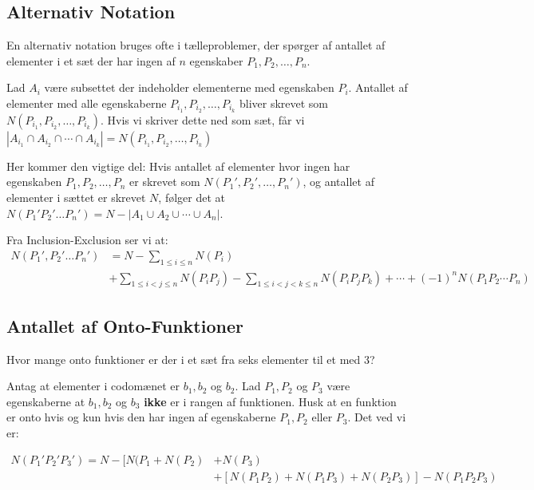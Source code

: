 \documentclass[11pt]{article}
\theoremstyle{definition}
\theoremstyle{remark}
\begin{document}
\subsection{Alternativ Notation}
\label{subsec:label}

En alternativ notation bruges ofte i tælleproblemer, der spørger af antallet af elementer i et sæt der har ingen af $n$ egenskaber $P_{1}, P_{2}, \ldots, P_{n}$.

Lad $A_{i}$ være subsettet der indeholder elementerne med egenskaben $P_{i}$. Antallet af elementer med alle egenskaberne $P_{i_{1}}, P_{i_{2}}, \ldots, P_{i_{k}}$ bliver skrevet som $N(P_{i_{1}}, P_{i_{2}}, \ldots, P_{i_{k}})$. Hvis vi skriver dette ned som sæt, får vi $|A_{i_{1}} \cap A_{i_{2}} \cap \cdots \cap A_{i_{k}}| = N(P_{i_{1}}, P_{i_{2}}, \ldots, P_{i_{k}})$

Her kommer den vigtige del: Hvis antallet af elementer hvor ingen har egenskaben $P_{1}, P_2, \ldots, P_{n}$ er skrevet som $N(P_{1}', P_{2}', \ldots, P_{n}')$, og antallet af elementer i sættet er skrevet $N$, følger det at $N(P_{1}'P_{2}'\ldots P_{n}') = N - |A_{1} \cup A_{2} \cup \cdots \cup A_{n}|$.

Fra Inclusion-Exclusion ser vi at:
\begin{equation}
  \begin{split}
    N(P_1', P_{2}' \ldots P_{n}') &= N - \sum_{1 \leq i \leq n}^{}N(P_{i}) \\
    &+ \sum_{1 \leq i < j \leq n}^{} N(P_{i}P_{j}) - \sum_{1 \leq i < j < k \leq n}^{}N(P_{i}P_{j}P_{k}) + \cdots + (-1)^{n}N(P_1P_{2} \cdots P_{n})
  \end{split}
\end{equation}



\subsection{Antallet af Onto-Funktioner}
\label{subsec:onto-funktioner}

Hvor mange onto funktioner er der i et sæt fra seks elementer til et med 3?

Antag at elementer i codomænet er $b_{1}, b_{2}$ og $b_{2}$. Lad $P_1, P_2$ og $P_{3}$ være egenskaberne at $b_{1}, b_{2}$ og $b_{3}$ \textbf{ikke} er i rangen af funktionen. Husk at en funktion er onto hvis og kun hvis den har ingen af egenskaberne $P_{1}, P_{2}$ eller $P_3$. Det ved vi er:

\begin{equation}
\begin{split}
  N(P_1'P_{2}'P_{3}') = N - [N(P_{1} + N(P_{2}) &+ N(P_{3})\\
  &+ [N(P_{1}P_{2}) + N(P_{1}P_{3}) + N(P_{2}P_{3})] - N(P_{1}P_{2}P_{3})
\end{split}
\end{equation}
\end{document}
